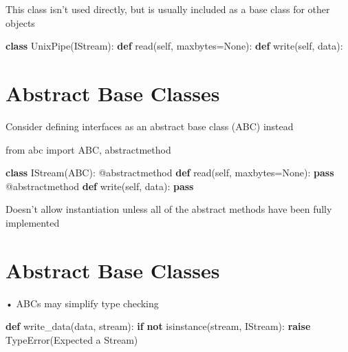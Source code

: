 \documentclass[
  letterpaper,
  DIV=11,
  numbers=noendperiod]{scrreprt}
\newenvironment{Shaded}{\begin{snugshade}}{\end{snugshade}}
\newcommand{\AttributeTok}[1]{\textcolor[rgb]{0.40,0.45,0.13}{#1}}
\newcommand{\BuiltInTok}[1]{\textcolor[rgb]{0.00,0.23,0.31}{#1}}
\newcommand{\ControlFlowTok}[1]{\textcolor[rgb]{0.00,0.23,0.31}{\textbf{#1}}}
\newcommand{\KeywordTok}[1]{\textcolor[rgb]{0.00,0.23,0.31}{\textbf{#1}}}
\newcommand{\NormalTok}[1]{\textcolor[rgb]{0.00,0.23,0.31}{#1}}
\newcommand{\OperatorTok}[1]{\textcolor[rgb]{0.37,0.37,0.37}{#1}}
\newcommand{\PreprocessorTok}[1]{\textcolor[rgb]{0.68,0.00,0.00}{#1}}
\newcommand{\StringTok}[1]{\textcolor[rgb]{0.13,0.47,0.30}{#1}}
\newcommand{\VariableTok}[1]{\textcolor[rgb]{0.07,0.07,0.07}{#1}}
\begin{document}
This class isn't used directly, but is usually included as a base class
for other objects

\begin{Shaded}
\begin{Highlighting}[]
\KeywordTok{class}\NormalTok{ UnixPipe(IStream): }\KeywordTok{def}\NormalTok{ read(}\VariableTok{self}\NormalTok{, maxbytes}\OperatorTok{=}\VariableTok{None}\NormalTok{): }\KeywordTok{def}\NormalTok{ write(}\VariableTok{self}\NormalTok{, data): }
\end{Highlighting}
\end{Shaded}


\chapter{Abstract Base Classes}\label{abstract-base-classes}

Consider defining interfaces as an abstract base class (ABC) instead

from abc import ABC, abstractmethod

\begin{Shaded}
\begin{Highlighting}[]
\KeywordTok{class}\NormalTok{ IStream(ABC):}
    \AttributeTok{@abstractmethod}
        \KeywordTok{def}\NormalTok{ read(}\VariableTok{self}\NormalTok{, maxbytes}\OperatorTok{=}\VariableTok{None}\NormalTok{):}
            \ControlFlowTok{pass}
        \AttributeTok{@abstractmethod}
            \KeywordTok{def}\NormalTok{ write(}\VariableTok{self}\NormalTok{, data):}
                \ControlFlowTok{pass} 
\end{Highlighting}
\end{Shaded}

Doesn't allow instantiation unless all of the abstract methods have been
fully implemented


\chapter{Abstract Base Classes}\label{abstract-base-classes-1}

• ABCs may simplify type checking

\begin{Shaded}
\begin{Highlighting}[]
\KeywordTok{def}\NormalTok{ write\_data(data, stream):}
    \ControlFlowTok{if} \KeywordTok{not} \BuiltInTok{isinstance}\NormalTok{(stream, IStream):}
        \ControlFlowTok{raise} \PreprocessorTok{TypeError}\NormalTok{(}\StringTok{\textquotesingle{}Expected a Stream\textquotesingle{}}\NormalTok{) }
\end{Highlighting}
\end{Shaded}
\end{document}
